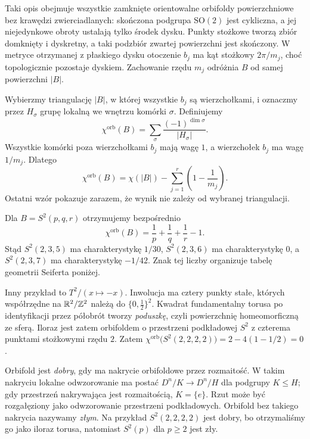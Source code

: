 Taki opis obejmuje wszystkie zamknięte orientowalne orbifoldy
powierzchniowe bez krawędzi zwierciadlanych: skończona podgrupa
$\mathrm{SO}(2)$ jest cykliczna, a jej niejedynkowe obroty
ustalają tylko środek dysku. Punkty stożkowe tworzą zbiór
domknięty i dyskretny, a taki podzbiór zwartej powierzchni
jest skończony.
W metryce otrzymanej z płaskiego dysku otoczenie $b_j$ ma
kąt stożkowy $2\pi/m_j$, choć topologicznie pozostaje dyskiem.
Zachowanie rzędu $m_j$ odróżnia $B$ od samej powierzchni $|B|$.

\begin{definicja}
\label{def:thurston-chi-orb}
Wybierzmy triangulację $|B|$, w której wszystkie $b_j$ są
wierzchołkami, i oznaczmy przez $H_\sigma$ grupę lokalną
we wnętrzu komórki $\sigma$. Definiujemy
\[
 \chi^{\mathrm{orb}}(B)
 =\sum_{\sigma}\frac{(-1)^{\dim\sigma}}{|H_\sigma|}.
\]
Wszystkie komórki poza wierzchołkami $b_j$ mają wagę $1$,
a wierzchołek $b_j$ ma wagę $1/m_j$. Dlatego
\[
 \chi^{\mathrm{orb}}(B)
 =\chi(|B|)-\sum_{j=1}^r\left(1-\frac1{m_j}\right).
\]
Ostatni wzór pokazuje zarazem, że wynik nie zależy od
wybranej triangulacji.
\end{definicja}

\begin{przyklad}
\label{prz:thurston-chi-orb-znaki}
Dla $B=S^2(p,q,r)$ otrzymujemy bezpośrednio
\[
 \chi^{\mathrm{orb}}(B)=\frac1p+\frac1q+\frac1r-1.
\]
Stąd $S^2(2,3,5)$ ma charakterystykę $1/30$,
$S^2(2,3,6)$ ma charakterystykę $0$, a $S^2(2,3,7)$
ma charakterystykę $-1/42$. Znak tej liczby organizuje
tabelę geometrii Seiferta poniżej.

Inny przykład to $T^2/(x\mapsto-x)$. Inwolucja ma cztery
punkty stałe, których współrzędne na $\mathbb{R}^2/\mathbb{Z}^2$ należą do
$\{0,\tfrac12\}^2$. Kwadrat fundamentalny torusa po
identyfikacji przez półobrót tworzy \emph{poduszkę}, czyli
powierzchnię homeomorficzną ze sferą. Iloraz jest zatem
orbifoldem o przestrzeni podkładowej $S^2$ z czterema punktami
stożkowymi rzędu $2$. Zatem
$\chi^{\mathrm{orb}}\bigl(S^2(2,2,2,2)\bigr)
=2-4(1-1/2)=0$.
\end{przyklad}

\begin{definicja}
\label{def:thurston-orbifold-dobry}
Orbifold jest \emph{dobry}, gdy ma nakrycie orbifoldowe przez
rozmaitość. W takim nakryciu lokalne odwzorowanie ma postać
$D^n/K\to D^n/H$ dla podgrupy $K\leq H$; gdy przestrzeń
nakrywająca jest rozmaitością, $K=\{e\}$. Rzut może być
rozgałęziony jako odwzorowanie przestrzeni podkładowych.
Orbifold bez takiego nakrycia nazywamy \emph{złym}.
Na przykład $S^2(2,2,2,2)$ jest dobry, bo otrzymaliśmy go
jako iloraz torusa, natomiast $S^2(p)$ dla $p\geq2$ jest zły.
\end{definicja}

